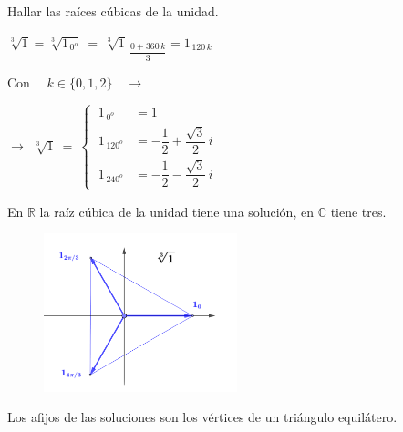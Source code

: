 \vspace{4mm}
\begin{miejemplo}

Hallar las raíces cúbicas de la unidad.
\begin{multicols}{2}
$\sqrt[3]{1}=\sqrt[3]{1_{\, 0^o}}\ = \ \sqrt[3]{1}_{\ \dfrac{0+360\, k}{3}}=1_{\, 120\, k} \ $

Con $\quad k\in \{0,1,2\} \quad \to \quad $

$\to \ \ \sqrt[3]{1} \ = \ \begin{cases}
 \ 1_{\, 0^o} &= 1 \\ \ 1_{\, 120^o} &= -\dfrac 1 2 +\dfrac{\sqrt{3}}{2}\, i 	\\ \ 1_{\, 240^o} &= -\dfrac 1 2 -\dfrac{\sqrt{3}}{2}\, i 
 \end{cases}$
 
 \vspace{2mm} En $\mathbb R$ la raíz cúbica de la unidad tiene una solución, en $\mathbb C$ tiene tres. 
 	
\begin{figure}[H]
	\centering
	\includegraphics[width=0.5\textwidth]{img-c/comp12.png}
\end{figure}
\end{multicols}
Los afijos de las soluciones son los vértices de un triángulo equilátero.
\end{miejemplo}


